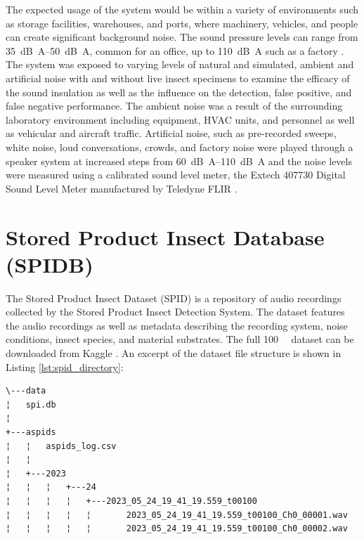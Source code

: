 The expected usage of the system would be within a variety of environments such as storage facilities, warehouses, and ports, where machinery, vehicles, and people can create significant background noise. The sound pressure levels can range from \SIrange{35}{50}{\deci\bel A}, common for an office, up to \SI{110}{\deci\bel A} such as a factory \cite{mankinPerspectivePromiseCentury2011,claudiaNoiseSourcesCharacterization2012}. The system was exposed to varying levels of natural and simulated, ambient and artificial noise with and without live insect specimens to examine the efficacy of the sound insulation as well as the influence on the detection, false positive, and false negative performance. The ambient noise was a result of the surrounding laboratory environment including equipment, HVAC units, and personnel as well as vehicular and aircraft traffic. Artificial noise, such as pre-recorded sweeps, white noise, loud conversations, crowds, and factory noise were played through a speaker system at increased steps from \SIrange{60}{110}{\deci\bel A} and the noise levels were measured using a calibrated sound level meter, the Extech 407730 Digital Sound Level Meter manufactured by Teledyne FLIR \cite{sonically_soundCrowdCafeteria2022,viertelnachvierFactory22014,inspectorjAmbienceMachineFactory2017, EXTECH407730Digital}.

\newpage
\section{Stored Product Insect Database (SPIDB)}

The Stored Product Insect Dataset (SPID) is a repository of audio recordings collected by the Stored Product Insect Detection System. The dataset features the audio recordings as well as metadata describing the recording system, noise conditions, insect species, and material substrates. The full \SI{100}{\giga\byte} dataset can be downloaded from Kaggle \cite{danielkadyrovStoredProductInsecta}. An excerpt of the dataset file structure is shown in Listing \ref{lst:spid_directory}:

\begin{listing}[htbp]
	\caption{File organization of the Stored Product Insect Dataset \label{lst:spid_directory}}
	\begin{verbatim}
\---data
¦   spi.db
¦  
+---aspids
¦   ¦   aspids_log.csv
¦   ¦   
¦   +---2023
¦   ¦   ¦   +---24
¦   ¦   ¦   ¦   +---2023_05_24_19_41_19.559_t00100
¦   ¦   ¦   ¦   ¦       2023_05_24_19_41_19.559_t00100_Ch0_00001.wav
¦   ¦   ¦   ¦   ¦       2023_05_24_19_41_19.559_t00100_Ch0_00002.wav
	\end{verbatim}
\end{listing}


